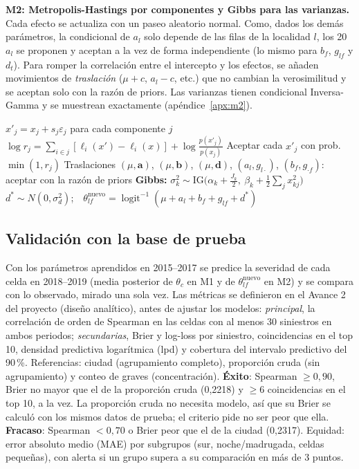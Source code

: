 \documentclass[10pt,twocolumn]{article}
\newcommand{\expit}{\operatorname{logit}^{-1}}
\begin{document}
\textbf{M2: Metropolis-Hastings por componentes y Gibbs para las varianzas.} Cada efecto se actualiza con un paseo aleatorio normal. Como, dados los demás parámetros, la condicional de $a_l$ solo depende de las filas de la localidad $l$, los 20 $a_l$ se proponen y aceptan a la vez de forma independiente (lo mismo para $b_f$, $g_{lf}$ y $d_t$). Para romper la correlación entre el intercepto y los efectos, se añaden movimientos de \emph{traslación} ($\mu+c$, $a_l-c$, etc.) que no cambian la verosimilitud y se aceptan solo con la razón de priors. Las varianzas tienen condicional Inversa-Gamma y se muestrean exactamente (apéndice~\ref{apx:m2}).
\begin{algorithm}[t]
\caption{MH por componentes + Gibbs para M2}\label{alg:m2}
\small
\begin{algorithmic}[1]
\State $x'_j=x_j+s_j\varepsilon_j$ para cada componente $j$
\State $\log r_j=\sum_{i\in j}[\ell_i(x')-\ell_i(x)]+\log\frac{p(x'_j)}{p(x_j)}$
\State Aceptar cada $x'_j$ con prob. $\min(1,r_j)$
\EndFor
\State Traslaciones $(\mu,\bm a)$, $(\mu,\bm b)$, $(\mu,\bm d)$, $(a_l,g_{l\cdot})$, $(b_f,g_{\cdot f})$: aceptar con la razón de priors
\State \textbf{Gibbs:} $\sigma_k^2\sim\mathrm{IG}\big(\alpha_k+\tfrac{J_k}{2},\ \beta_k+\tfrac12\sum_j x_{kj}^2\big)$
\State $d^*\sim N(0,\sigma_d^2)$;\ \ $\theta^{\mathrm{nuevo}}_{lf}=\expit(\mu+a_l+b_f+g_{lf}+d^*)$
\EndFor
\end{algorithmic}
\end{algorithm}

\subsection{Validación con la base de prueba}
Con los parámetros aprendidos en 2015--2017 se predice la severidad de cada celda en 2018--2019 (media posterior de $\theta_c$ en M1 y de $\theta^{\mathrm{nuevo}}_{lf}$ en M2) y se compara con lo observado, mirado una sola vez. Las métricas se definieron en el Avance 2 del proyecto (diseño analítico), antes de ajustar los modelos: \emph{principal}, la correlación de orden de Spearman en las celdas con al menos 30 siniestros en ambos periodos; \emph{secundarias}, Brier \citep{brier1950} y log-loss por siniestro, coincidencias en el top 10, densidad predictiva logarítmica (lpd) y cobertura del intervalo predictivo del 90\,\%. Referencias: ciudad (agrupamiento completo), proporción cruda (sin agrupamiento) y conteo de graves (concentración). \textbf{Éxito}: Spearman $\ge0{,}90$, Brier no mayor que el de la proporción cruda (0,2218) y $\ge6$ coincidencias en el top 10, a la vez. La proporción cruda no necesita modelo, así que su Brier se calculó con los mismos datos de prueba; el criterio pide no ser peor que ella. \textbf{Fracaso}: Spearman $<0{,}70$ o Brier peor que el de la ciudad (0,2317). Equidad: error absoluto medio (MAE) por subgrupos (sur, noche/madrugada, celdas pequeñas), con alerta si un grupo supera a su comparación en más de 3 puntos.
\end{document}
